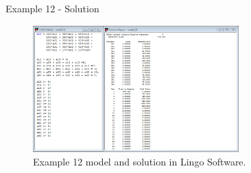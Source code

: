 \begin{frame}{Example 12 - Solution}
\begin{figure}
    \includegraphics[width=300px]{slides/ex12/screenshot.png}
    \caption{Example 12 model and solution in Lingo Software.}
\end{figure}
\end{frame}
